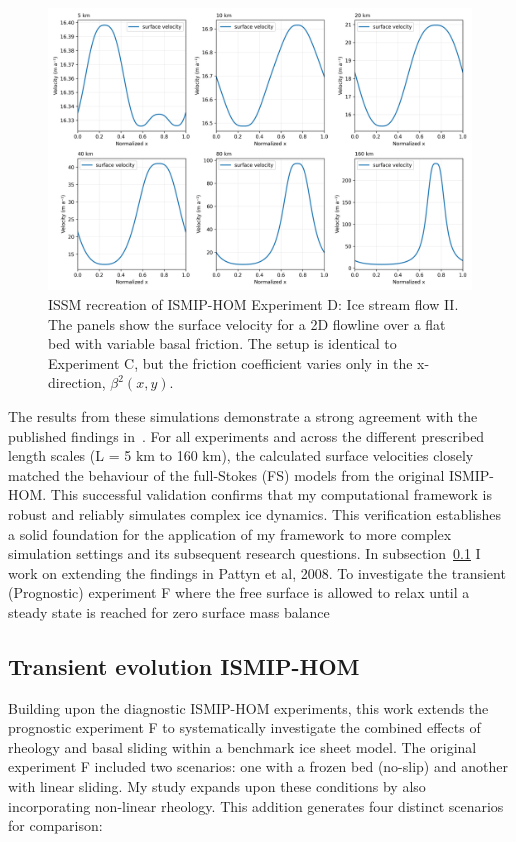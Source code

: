 \begin{figure}[H]
    \includegraphics[scale=0.45]{ExpD_velocity_panels.png}
    \caption{ ISSM recreation of ISMIP-HOM Experiment D: Ice stream flow II. The panels show the surface velocity for a 2D flowline over a flat bed with variable basal friction. The setup is identical to Experiment C, but the friction coefficient varies only in the x-direction, $\beta^{2}(x,y)$.}
    \label{fig:4.4}
\end{figure}

The results from these simulations demonstrate a strong agreement with the published findings in~\cite{Pattyn_2008}. For all experiments and across the different prescribed length scales (L = 5 km to 160 km), the calculated surface velocities closely matched the behaviour of the full-Stokes (FS) models from the original ISMIP-HOM. This successful validation confirms that my computational framework is robust and reliably simulates complex ice dynamics. This verification establishes a solid foundation for the application of my framework to more complex simulation settings and its subsequent research questions. In subsection~\ref{transient_ismip} I work on extending the findings in Pattyn et al, 2008. To investigate the transient (Prognostic) experiment F where the free surface is allowed to relax until a steady state is reached for zero surface mass balance~\cite{Pattyn_2008}


\subsection{Transient evolution ISMIP-HOM}\label{transient_ismip}

Building upon the diagnostic ISMIP-HOM experiments, this work extends the prognostic experiment F to systematically investigate the combined effects of rheology and basal sliding within a benchmark ice sheet model. The original experiment F included two scenarios: one with a frozen bed (no-slip) and another with linear sliding. My study expands upon these conditions by also incorporating non-linear rheology. This addition generates four distinct scenarios for comparison:

